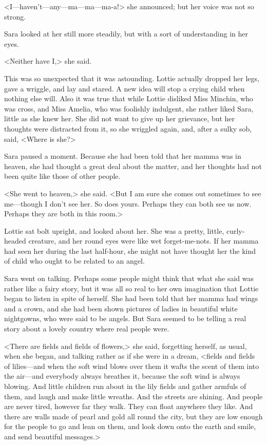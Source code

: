 <I—haven't—any—ma—ma—ma-a!> she announced; but her voice was not so strong.

Sara looked at her still more steadily, but with a sort of understanding in her eyes.

<Neither have I,> she said.

This was so unexpected that it was astounding. Lottie actually dropped her legs, gave a wriggle, and lay and stared. A new idea will stop a crying child when nothing else will. Also it was true that while Lottie disliked Miss Minchin, who was cross, and Miss Amelia, who was foolishly indulgent, she rather liked Sara, little as she knew her. She did not want to give up her grievance, but her thoughts were distracted from it, so she wriggled again, and, after a sulky sob, said, <Where is she?>

Sara paused a moment. Because she had been told that her mamma was in heaven, she had thought a great deal about the matter, and her thoughts had not been quite like those of other people.

<She went to heaven,> she said. <But I am sure she comes out sometimes to see me—though I don't see her. So does yours. Perhaps they can both see us now. Perhaps they are both in this room.>

Lottie sat bolt upright, and looked about her. She was a pretty, little, curly-headed creature, and her round eyes were like wet forget-me-nots. If her mamma had seen her during the last half-hour, she might not have thought her the kind of child who ought to be related to an angel.

Sara went on talking. Perhaps some people might think that what she said was rather like a fairy story, but it was all so real to her own imagination that Lottie began to listen in spite of herself. She had been told that her mamma had wings and a crown, and she had been shown pictures of ladies in beautiful white nightgowns, who were said to be angels. But Sara seemed to be telling a real story about a lovely country where real people were.

<There are fields and fields of flowers,> she said, forgetting herself, as usual, when she began, and talking rather as if she were in a dream, <fields and fields of lilies—and when the soft wind blows over them it wafts the scent of them into the air—and everybody always breathes it, because the soft wind is always blowing. And little children run about in the lily fields and gather armfuls of them, and laugh and make little wreaths. And the streets are shining. And people are never tired, however far they walk. They can float anywhere they like. And there are walls made of pearl and gold all round the city, but they are low enough for the people to go and lean on them, and look down onto the earth and smile, and send beautiful messages.>


